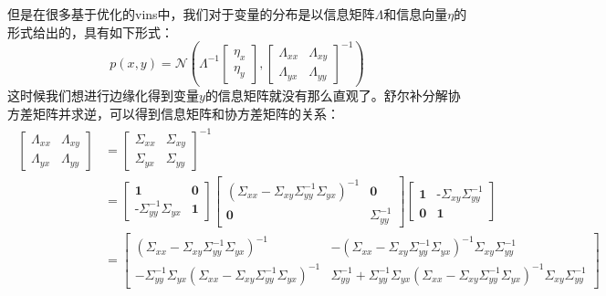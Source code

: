 \documentclass[a4pape,oneside,10pt]{article}
\begin{document}
但是在很多基于优化的vins中，我们对于变量的分布是以信息矩阵$\varLambda$和信息向量$\eta$的形式给出的，具有如下形式：
\begin{equation}
    p(x,y) = \mathcal{N} (
        \varLambda^{-1}
        \begin{bmatrix}
            \textbf{$\eta_x$} \\
            \textbf{$\eta_y$}
        \end{bmatrix},
        \begin{bmatrix}
            \textbf{$\varLambda_{xx}$} & \textbf{$\varLambda_{xy}$} \\
            \textbf{$\varLambda_{yx}$} & \textbf{$\varLambda_{yy}$}
        \end{bmatrix}^{-1}
        )
\end{equation}
这时候我们想进行边缘化得到变量$y$的信息矩阵就没有那么直观了。舒尔补分解协方差矩阵并求逆，可以得到信息矩阵和协方差矩阵的关系：
\begin{equation}
    \begin{split}
        \begin{aligned}
    \begin{bmatrix}
        \textbf{$\varLambda_{xx}$} & \textbf{$\varLambda_{xy}$} \\
        \textbf{$\varLambda_{yx}$} & \textbf{$\varLambda_{yy}$}
    \end{bmatrix}
    &=
    \begin{bmatrix}
        \textbf{$\Sigma_{xx}$} & \textbf{$\Sigma_{xy}$} \\
        \textbf{$\Sigma_{yx}$} & \textbf{$\Sigma_{yy}$}
    \end{bmatrix} ^{-1} \\
    &=
    \begin{bmatrix}
        \textbf{1} & \textbf{0} \\
        \textbf{-$\Sigma_{yy}^{-1}\Sigma_{yx}$} & \textbf{1}
    \end{bmatrix}     
    \begin{bmatrix}
        \textbf{$(\Sigma_{xx} - \Sigma_{xy}\Sigma_{yy}^{-1}\Sigma_{yx})^{-1}$} & \textbf{0} \\
        \textbf{0} & \textbf{$\Sigma_{yy}^{-1}$}
    \end{bmatrix}
    \begin{bmatrix}
        \textbf{1} & \textbf{-$\Sigma_{xy}\Sigma_{yy}^{-1}$} \\
        \textbf{0} & \textbf{1}
    \end{bmatrix}  \\
    &=
    \begin{bmatrix}
        \textbf{$(\Sigma_{xx} - \Sigma_{xy}\Sigma_{yy}^{-1}\Sigma_{yx})^{-1}$} & \textbf{$-(\Sigma_{xx} - \Sigma_{xy}\Sigma_{yy}^{-1}\Sigma_{yx})^{-1}\Sigma_{xy}\Sigma_{yy}^{-1}$} \\
        \textbf{$-\Sigma_{yy}^{-1}\Sigma_{yx}(\Sigma_{xx} - \Sigma_{xy}\Sigma_{yy}^{-1}\Sigma_{yx})^{-1}$} & \textbf{$\Sigma_{yy}^{-1} + \Sigma_{yy}^{-1}\Sigma_{yx}(\Sigma_{xx} - \Sigma_{xy}\Sigma_{yy}^{-1}\Sigma_{yx})^{-1}\Sigma_{xy}\Sigma_{yy}^{-1}$}
    \end{bmatrix}    
\end{aligned}
\end{split}
\end{equation}
\end{document}
